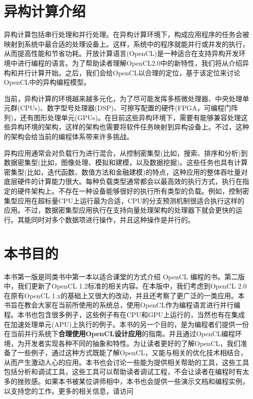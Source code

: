 

\section{异构计算介绍}

异构计算包括串行处理和并行处理。在异构计算环境下，构成应用程序的任务会被映射到系统中最合适的处理设备上。这样，系统中的程序就能并行或并发的执行，从而提高性能和节省功耗。开放计算语言(OpenCL)是一种适合在支持异构开发环境中进行编程的语言。为了帮助读者理解OpenCL2.0中的新特性，我们将从介绍异构和并行计算开始。之后，我们会给OpenCL以合理的定位，基于该定位来讨论OpenCL中的异构编程模型。

当前，异构计算的环境越来越多元化，为了尽可能发挥多核微处理器、中央处理单元群(CPUs)、数字型号处理器(DSP)、可擦写配置的硬件(FPGA，可编程门阵列)，还有图形处理单元(GPUs)。在目前这些异构环境下，需要有能够兼容处理这些异构环境的架构，这样的架构也需要将软件任务映射到异构设备上。不过，这种的架构会给当前的编程体系带来许多挑战。

异构应用通常会对负载行为进行混合，从控制密集型(比如，搜索、排序和分析)到数据密集型(比如，图像处理、模拟和建模，以及数据挖掘)。这些任务也具有计算密集型(比如，迭代函数、数值方法和金融建模)的特点，这种应用的整体吞吐量对底层硬件的计算能力很大。每种负载类型通常都会以最高效的执行方式，执行在指定的硬件架构上。不存在一种设备能够很好的执行所有类型的负载。例如，控制密集型应用在超标量CPU上运行最为合适，CPU的分支预测机制很适合执行这样的应用。不过，数据密集型应用执行在支持向量处理架构的处理器下就会更快的运行。其能同时对多个数据项进行操作，并且这种操作是并行的。



\section{本书目的}

本书第一版是同类书中第一本以适合课堂的方式介绍 OpenCL 编程的书。第二版中，我们更新了OpenCL 1.2标准的相关内容。在本版中，我们考虑到OpenCL 2.0在原有OpenCL 1.x的基础上又很大的改动，并且还考察了更广泛的一类应用。本书旨在教会大家在当前所使用的系统总，使用OpenCL作为编程语言进行并行编程。本书也包含很多例子，这些例子有在CPU和GPU上运行的，当然也有在集成在加速处理单元(APU)上执行的例子。本书的另一个目的，是为编程者们提供一份在当前并行系统下\textbf{合理使用OpenCL设计应用}的指南。并且通过OpenCL编程环境，为开发者实现各种不同的抽象和特性。为让读者更好的了解OpenCL，我们准备了一些例子，通过这种方式既能了解OpenCL，又能与相关的优化技术相结合，从而产生激动人心的应用。本书也会讨论一些能为提供相关帮助的工具，这些工具包括分析和调试工具，这些工具可以帮助读者调试工程，不会让读者在编程时有太多的挫败感。如果本书被某位讲师相中，本书也会提供一些演示文档和编程实例，以支持您的工作。更多的相关信息，请访问 



